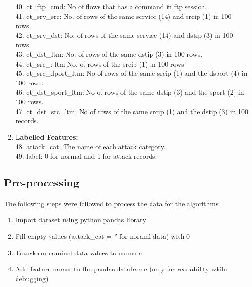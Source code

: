 \documentclass[a4paper,12pt]{article}
\begin{document}
\begin{enumerate}
                    40. ct\_ftp\_cmd: No of flows that has a command in ftp session. \\
                    41. ct\_srv\_src: No. of rows of the same service (14) and srcip (1) in 100 rows. \\
                    42. ct\_srv\_dst: No. of rows of the same service (14) and dstip (3) in 100 rows. \\
                    43. ct\_dst\_ltm: No. of rows of the same dstip (3) in 100 rows. \\
                    44. ct\_src\_: ltm No. of rows of the srcip (1) in 100 rows. \\
                    45. ct\_src\_dport\_ltm: No of rows of the same srcip (1) and the dsport (4) in 100 rows. \\
                    46. ct\_dst\_sport\_ltm: No of rows of the same dstip (3) and the sport (2) in 100 rows. \\
                    47. ct\_dst\_src\_ltm: No of rows of the same srcip (1) and the dstip (3) in 100 records.
                \item \textbf{Labelled Features:} \\
                    48. attack\_cat: The name of each attack category. \\
                    49. label: 0 for normal and 1 for attack records.
            \end{enumerate}

        \subsection{Pre-processing}
        \paragraph{}
        The following steps were followed to process the data for the algorithms:
        \begin{enumerate}
            \item Import dataset using python pandas library
            \item Fill empty values (attack\_cat = '' for noraml data) with 0
            \item Transform nominal data values to numeric
            \item Add feature names to the pandas dataframe (only for readability while debugging)
        \end{enumerate}
\end{document}
